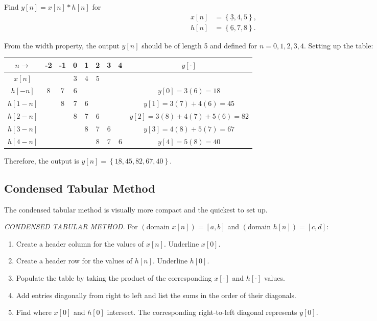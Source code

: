 \documentclass{report}
\begin{document}
\begin{example}
    Find $y[n]=x[n]*h[n]$ for 
    \begin{align*}
        x[n] &= \left\{\underline{3},4,5\right\}, \\
        h[n] &= \left\{\underline{6},7,8\right\}.
    \end{align*}
\end{example}
\begin{solution}
    From the width property, the output $y[n]$ should be of length 5 and defined for $n=0,1,2,3,4$. Setting up the table:
    \begin{center}
        \begin{tabular}{c|ccccccc|c}
            $n \rightarrow $ & -2 & -1 & 0 & 1 & 2 & 3 & 4 & $y[\cdot]$ \\
            \hline
            $x[n]$ & & & 3 & 4 & 5 & & & \\
            \hline
            $h[-n]$ & 8 & 7 & 6 & & & & & $y[0] = 3(6) = 18$ \\
            $h[1-n]$ & & 8 & 7 & 6 & & & & $y[1] = 3(7) + 4(6) = 45$ \\
            $h[2-n]$ & & & 8 & 7 & 6 & & & $y[2] = 3(8) + 4(7) + 5(6) = 82$\\
            $h[3-n]$ & & & & 8 & 7 & 6 & & $y[3] = 4(8) + 5(7) = 67$ \\
            $h[4-n]$ & & & & & 8 & 7 & 6 & $y[4] = 5(8) = 40$ 
        \end{tabular}
    \end{center}
    Therefore, the output is $y[n]=\left\{\underline{18},45,82,67,40\right\}$.
\end{solution}

\subsection{Condensed Tabular Method}
The condensed tabular method is visually more compact and the quickest to set up.

\begin{tcolorbox}[width=\textwidth,colback={white}, sharp corners]
    \noindent\emph{CONDENSED TABULAR METHOD.} For $(\text{domain } x[n]) = [a,b]$ and $(\text{domain } h[n]) = [c,d]$:
    \begin{enumerate}[Step 1:]
        \item Create a header column for the values of $x[n]$. Underline $x[0]$.
        \item Create a header row for the values of $h[n]$. Underline $h[0]$.
        \item Populate the table by taking the product of the corresponding $x[\cdot]$ and $h[\cdot]$ values.
        \item Add entries diagonally from right to left and list the sums in the order of their diagonals.
        \item Find where $x[0]$ and $h[0]$ intersect. The corresponding right-to-left diagonal represents $y[0]$.
    \end{enumerate}
\end{tcolorbox}
\end{document}
